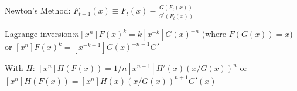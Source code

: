 Newton's Method: $F_{t+1}(x) \equiv F_{t}(x)-\frac{G\left(F_{t}(x)\right)}{G^{\prime}\left(F_{t}(x)\right)}$

Lagrange inversion:$n[x^n]F(x)^k=k[x^{-k}]G(x)^{-n}$ (where $F(G(x))=x$) or $[x^n]F(x)^k=[x^{-k-1}]G(x)^{-n-1}G'$

With $H$: $[x^n]H(F(x))=1/n [x^{n-1}]H'(x)(x/G(x))^n$ or $[x^n]H(F(x))=[x^n]H(x)(x/G(x))^{n+1}G'(x)$